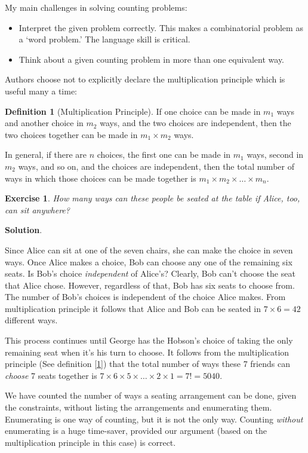 \documentclass[11pt]{book}
\theoremstyle{definition}
\newtheorem{definition}{Definition}
\theoremstyle{plain}
\newtheorem{exercise}{Exercise}
\theoremstyle{definition}
\theoremstyle{problemstyle}
\theoremstyle{remark}
\theoremstyle{definition}
\begin{document}
My main challenges in solving counting problems:
\begin{itemize}
    \item Interpret the given problem correctly. This makes a combinatorial problem as a `word problem.' The language skill is critical.
    \item Think about a given counting problem in more than one equivalent way. 
\end{itemize}

Authors choose not to explicitly declare the multiplication principle which is useful many a time:
\begin{definition}[Multiplication Principle]
    \label{def:mp}
If one choice can be made in $m_1$ ways and another choice in $m_2$ ways, and the two choices are independent, then the two choices together can be made in $m_1\times m_2$ ways.

In general, if there are $n$ choices, the first one can be made in $m_1$ ways, second in $m_2$ ways, and so on, and the choices are independent, then the total number of ways in which those choices can be made together is $m_1\times m_2\times\dots\times m_n$.
\end{definition}

\begin{exercise}
    How many ways can these people be seated at the table if Alice, too, can sit anywhere?
    \label{ex:1.1.1}
\end{exercise}
\textbf{Solution}.

Since Alice can sit at one of the seven chairs, she can make the choice in seven ways. Once Alice makes a choice, Bob can choose any one of the remaining six seats. Is Bob's choice \emph{independent} of Alice's? Clearly, Bob can't choose the seat that Alice chose. However, regardless of that, Bob has six seats to choose from. The number of Bob's choices is independent of the choice Alice makes. From multiplication principle it follows that Alice and Bob can be seated in $7\times 6=42$ different ways. 

This process continues until George has the Hobson's choice of taking the only remaining seat when it's his turn to choose. It follows from the multiplication principle (See definition [\ref{def:mp}]) that the total number of ways these 7 friends can \emph{choose} 7 seats together is $7\times 6\times 5\times\dots\times 2\times 1=7!=5040$.

We have counted the number of ways a seating arrangement can be done, given the constraints, without listing the arrangements and enumerating them. Enumerating is one way of counting, but it is not the only way. Counting \emph{without} enumerating is a huge time-saver, provided our argument (based on the multiplication principle in this case) is correct. 
\end{document}

